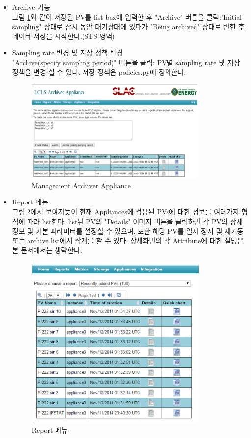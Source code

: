 \documentclass[11pt
  , a4paper
  , article
  , oneside
]{memoir}
\begin{document}
\begin{itemize}
	\item Archive 기능 \\
	그림 \ref{fig:mgmt_appliance}와 같이 저장될 PV를 list box에 입력한 후 "Archive" 버튼을 클릭:"Initial sampling" 상태로 잠시 동안 대기상태에 있다가 "Being archived" 상태로 변한 후 데이터 저장을 시작한다.(STS 영역)
	\item Sampling rate 변경 및 저장 정책 변경 \\
	"Archive(specify sampling period)" 버튼을 클릭: PV별 sampling rate 및 저장 정책을 변경 할 수 있다.
	저장 정책은 policies.py에 정의한다. 
	\begin{figure}[h!]
		\centering
		\includegraphics[width=0.85\textwidth, height=0.5\textwidth]{./images/image-5.eps}
		\caption{Management Archiver Appliance}
		\label{fig:mgmt_appliance} 
	\end{figure}
	
\clearpage	

	\item Report 메뉴 \\
	그림 \ref{fig:report}에서 보여지듯이 현재 Appliances에 적용된 PVs에 대한 정보를 여러가지 형식에 따라 list한다. list된 PV의 "Details" 이미지 버튼을 클릭하면 각 PV의 상세정보 및 기본 파라미터를 설정할 수 있으며, 또한 해당 PV를 일시 정지 및 재기동 또는 archive list에서 삭제를 할 수 있다. 상세화면의 각 Attribute에 대한 설명은 본 문서에서는 생략한다.
	\begin{figure}[h!]
		\centering
		\includegraphics[width=0.85\textwidth, height=0.6\textwidth]{./images/report.eps}
		\caption{Report 메뉴}
		\label{fig:report} 
	\end{figure}
\clearpage


\end{itemize}
\end{document}
